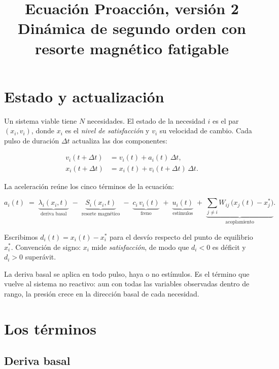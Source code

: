 \documentclass[11pt,a4paper]{article}
\title{Ecuación Proacción, versión 2\\[2pt]
\large Dinámica de segundo orden con resorte magnético fatigable}
\author{}
\date{}
\begin{document}
\maketitle

\section{Estado y actualización}

Un sistema viable tiene $N$ necesidades. El estado de la necesidad $i$ es el par
$(x_i, v_i)$, donde $x_i$ es el \emph{nivel de satisfacción} y $v_i$ su velocidad de cambio.
Cada pulso de duración $\Delta t$ actualiza las dos componentes:

\begin{align}
  v_i(t+\Delta t) &= v_i(t) + a_i(t)\,\Delta t, \label{eq:vel}\\
  x_i(t+\Delta t) &= x_i(t) + v_i(t+\Delta t)\,\Delta t . \label{eq:pos}
\end{align}

La aceleración reúne los cinco términos de la ecuación:

\begin{equation}
  a_i(t) \;=\;
  \underbrace{\lambda_i\!\left(x_i,t\right)}_{\text{deriva basal}}
  \;-\;\underbrace{S_i\!\left(x_i,t\right)}_{\text{resorte magnético}}
  \;-\;\underbrace{c_i\,v_i(t)}_{\text{freno}}
  \;+\;\underbrace{u_i(t)}_{\text{estímulos}}
  \;+\;\underbrace{\sum_{j\neq i} W_{ij}\,\big(x_j(t)-x_j^{*}\big)}_{\text{acoplamiento}} .
  \label{eq:epa}
\end{equation}

Escribimos $d_i(t) = x_i(t) - x_i^{*}$ para el desvío respecto del punto de equilibrio
$x_i^{*}$. Convención de signo: $x_i$ mide \emph{satisfacción}, de modo que $d_i<0$ es
déficit y $d_i>0$ superávit.

La deriva basal se aplica en todo pulso, haya o no estímulos. Es el término que vuelve
al sistema no reactivo: aun con todas las variables observadas dentro de rango, la
presión crece en la dirección basal de cada necesidad.

\section{Los términos}

\subsection{Deriva basal}
\end{document}
